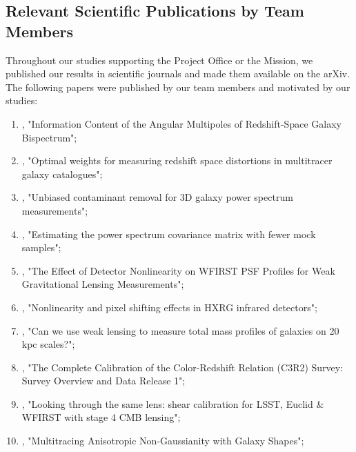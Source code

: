 \subsection{Relevant Scientific Publications by Team Members}

Throughout our studies supporting the Project Office or the Mission, we published our results in scientific journals and made them available on the arXiv. The following  papers were published by our team members and motivated by our studies:

\begin{enumerate}
\item \citet{2017MNRAS.467..928G}, "Information Content of the Angular Multipoles of Redshift-Space Galaxy Bispectrum";
\item \citet{2016MNRAS.463.2708P}, "Optimal weights for measuring redshift space distortions in multitracer galaxy catalogues";
\item \citet{2016MNRAS.463..467K}, "Unbiased contaminant removal for 3D galaxy power spectrum measurements";
\item \citet{2016MNRAS.457..993P}, "Estimating the power spectrum covariance matrix with fewer mock samples";
\item \citet{2016PASP..128j4001P}, "The Effect of Detector Nonlinearity on WFIRST PSF Profiles for Weak Gravitational Lensing Measurements";
\item \citet{2017JInst..12C4009P}, "Nonlinearity and pixel shifting effects in HXRG infrared detectors";
\item \citet{2015MNRAS.449.2128K}, "Can we use weak lensing to measure total mass profiles of galaxies on 20 kpc scales?";
\item \citet{2017arXiv170406665M}, "The Complete Calibration of the Color-Redshift Relation (C3R2) Survey: Survey Overview and Data Release 1";
\item \citet{Schaan:2016ois}, "Looking through the same lens: shear calibration for LSST, Euclid \& WFIRST with stage 4 CMB lensing";
\item \citet{Chisari:2016xki}, "Multitracing Anisotropic Non-Gaussianity with Galaxy Shapes";
\end{enumerate}
